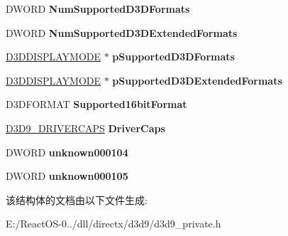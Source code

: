 \begin{DoxyCompactItemize}
\item 
\mbox{\label{struct___direct3_d9_display_adapter_info_a7315a2251f9c0314d41529f87f1390c0}} 
D\+W\+O\+RD {\bfseries Num\+Supported\+D3\+D\+Formats}
\item 
\mbox{\label{struct___direct3_d9_display_adapter_info_a992d6f52148fb068ca56de4de4b5e490}} 
D\+W\+O\+RD {\bfseries Num\+Supported\+D3\+D\+Extended\+Formats}
\item 
\mbox{\label{struct___direct3_d9_display_adapter_info_ab33300519ecccab42a2f06c23b59a7c9}} 
\hyperlink{struct___d3_d_d_i_s_p_l_a_y_m_o_d_e}{D3\+D\+D\+I\+S\+P\+L\+A\+Y\+M\+O\+DE} $\ast$ {\bfseries p\+Supported\+D3\+D\+Formats}
\item 
\mbox{\label{struct___direct3_d9_display_adapter_info_ab8c2675086079da93bd65ff48bbc8439}} 
\hyperlink{struct___d3_d_d_i_s_p_l_a_y_m_o_d_e}{D3\+D\+D\+I\+S\+P\+L\+A\+Y\+M\+O\+DE} $\ast$ {\bfseries p\+Supported\+D3\+D\+Extended\+Formats}
\item 
\mbox{\label{struct___direct3_d9_display_adapter_info_ad9728721eec62ca7d6f0444fedcb451f}} 
D3\+D\+F\+O\+R\+M\+AT {\bfseries Supported16bit\+Format}
\item 
\mbox{\label{struct___direct3_d9_display_adapter_info_ab2a044201534f8bd0239df6855d800a1}} 
\hyperlink{struct___d3_d9___d_r_i_v_e_r_c_a_p_s}{D3\+D9\+\_\+\+D\+R\+I\+V\+E\+R\+C\+A\+PS} {\bfseries Driver\+Caps}
\item 
\mbox{\label{struct___direct3_d9_display_adapter_info_a7e2e97dd1e3a8fc226251b65f2dd1a13}} 
D\+W\+O\+RD {\bfseries unknown000104}
\item 
\mbox{\label{struct___direct3_d9_display_adapter_info_a3ba7b534efccbae3040cc5754a7b6e84}} 
D\+W\+O\+RD {\bfseries unknown000105}
\end{DoxyCompactItemize}


该结构体的文档由以下文件生成\+:\begin{DoxyCompactItemize}
\item 
E\+:/\+React\+O\+S-\/0../dll/directx/d3d9/d3d9\+\_\+private.\+h\end{DoxyCompactItemize}

